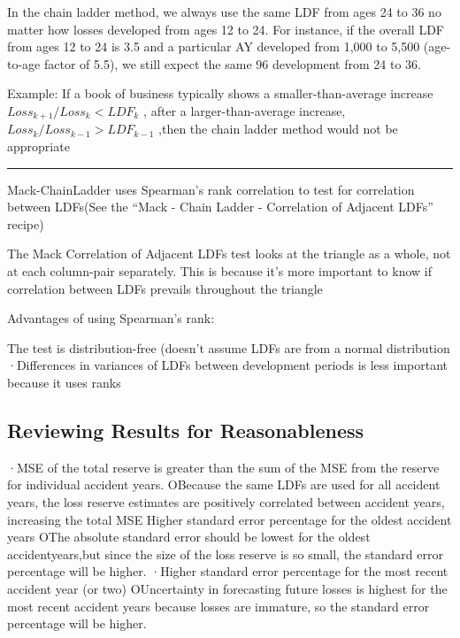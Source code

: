 \documentclass[
]{article}
\begin{document}
In the chain ladder method, we always use the same LDF from ages 24 to
36 no matter how losses developed from ages 12 to 24. For instance, if
the overall LDF from ages 12 to 24 is 3.5 and a particular AY developed
from 1,000 to 5,500 (age-to-age factor of 5.5), we still expect the same
96 development from 24 to 36.

Example: If a book of business typically shows a smaller-than-average
increase \(Loss_{k+1}/Loss_{k}<LDF_{k}\) , after a larger-than-average
increase, \(Loss_{k}/Loss_{k-1}>LDF_{k-1}\) ,then the chain ladder
method would not be appropriate

\begin{center}\rule{0.5\linewidth}{0.5pt}\end{center}

Mack-ChainLadder uses Spearman's rank correlation to test for
correlation between LDFs(See the ``Mack - Chain Ladder - Correlation of
Adjacent LDFs'' recipe)

The Mack Correlation of Adjacent LDFs test looks at the triangle as a
whole, not at each column-pair separately. This is because it's more
important to know if correlation between LDFs prevails throughout the
triangle

Advantages of using Spearman's rank:

The test is distribution-free (doesn't assume LDFs are from a normal
distribution ·Differences in variances of LDFs between development
periods is less important because it uses ranks

\subsection{Reviewing Results for
Reasonableness}\label{reviewing-results-for-reasonableness}

·MSE of the total reserve is greater than the sum of the MSE from the
reserve for individual accident years. OBecause the same LDFs are used
for all accident years, the loss reserve estimates are positively
correlated between accident years, increasing the total MSE Higher
standard error percentage for the oldest accident years OThe absolute
standard error should be lowest for the oldest accidentyears,but since
the size of the loss reserve is so small, the standard error percentage
will be higher. ·Higher standard error percentage for the most recent
accident year (or two) OUncertainty in forecasting future losses is
highest for the most recent accident years because losses are immature,
so the standard error percentage will be higher.
\end{document}
